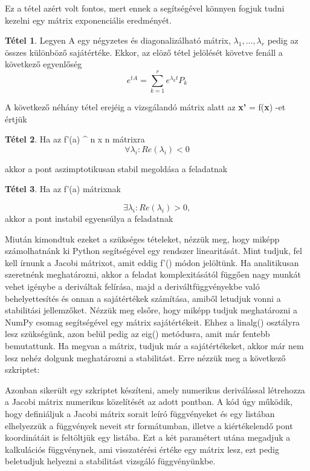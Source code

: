 \documentclass{article}
\theoremstyle{definition}
\theoremstyle{theorem}
\newtheorem{theorem}{Tétel}
\begin{document}
Ez a tétel azért volt fontos, mert ennek a segítségével könnyen fogjuk tudni kezelni egy mátrix exponenciális eredményét.

\begin{theorem}
Legyen A egy négyzetes és diagonalizálható mátrix, $\lambda_1,...,\lambda_r$ pedig az összes különböző sajátértéke. Ekkor, az elöző tétel jelölését követve fenáll a következő egyenlőség
\begin{equation*}
    e^{tA} = \sum_{k=1}^r e^{\lambda_k t} P_k
\end{equation*}
\end{theorem}
A következő néhány tétel erejéig a vizsgálandó mátrix alatt az \textbf{x'} = f(\textbf{x}) -et értjük
\begin{theorem}
Ha az f'(a) \in {} ^ {n x n} \;\;mátrixra \;\;
\begin{equation*}
    \forall \lambda_i : Re(\lambda_i) < 0
\end{equation*}

akkor a pont aszimptotikusan stabil megoldása a feladatnak
\end{theorem}

\begin{theorem}
Ha az f'(a) mátrixnak

\begin{equation*}
    \exists \lambda_i : Re(\lambda_i) > 0,
\end{equation*}
 akkor a pont instabil egyensúlya a feladatnak
\end{theorem}

Miután kimondtuk ezeket a szükséges tételeket, nézzük meg, hogy miképp számolhatnánk ki Python segítségével egy rendszer linearitását. Mint tudjuk, fel kell írnunk a Jacobi mátrixot, amit eddig f'() módon jelöltünk. Ha analitikusan szeretnénk meghatározni, akkor a feladat komplexitásától függően nagy munkát vehet igénybe a deriváltak felírása, majd a deriváltfüggvényekbe való behelyettesítés és onnan a sajátértékek számítása, amiből letudjuk vonni a stabilitási jellemzőket. Nézzük meg elsőre, hogy miképp tudjuk meghatározni a NumPy csomag segítségével egy mátrix sajátértékeit. Ehhez a linalg() osztályra lesz szükségünk, azon belül pedig az eig() metódusra, amit már fentebb bemutattunk. Ha megvan a mátrix, tudjuk már a sajátértékeket, akkor már nem lesz nehéz dolgunk meghatározni a stabilitást. Erre nézzük meg a következő szkriptet:



Azonban sikerült egy szkriptet készíteni, amely numerikus deriválással létrehozza a Jacobi mátrix numerikus közelítését az adott pontban. A kód úgy működik, hogy definiáljuk a Jacobi mátrix sorait leíró függvényeket és egy listában elhelyezzük a függvények neveit str formátumban, illetve a kiértékelendő pont koordinátáit is feltöltjük egy listába. Ezt a két paramétert utána megadjuk a kalkulációs függvénynek, ami visszatérési értéke egy mátrix lesz, ezt pedig beletudjuk helyezni a stabilitást vizsgáló függvényünkbe.
\end{document}
